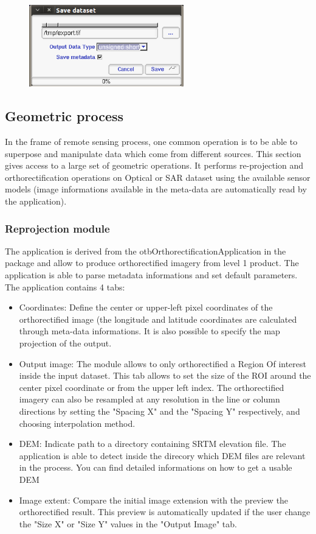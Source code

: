 \begin{figure}
  \center
  \includegraphics[width=0.6\textwidth]{../Art/MonteverdiImages/monteverdi_export_dataset.png}
  \label{fig:concatenate}
\end{figure}

\subsection{Geometric process}
In the frame of remote sensing process, one common operation is to be
able to superpose and manipulate data which come from different
sources.  This section gives access to a large set of geometric
operations.  It performs re-projection and orthorectification
operations on Optical or SAR dataset using the available sensor models
(image informations available in the meta-data are automatically read
by the application).  
\subsubsection{Reprojection module}
The application is derived from the otbOrthorectificationApplication
in the \app package and allow to produce orthorectified imagery from
level 1 product. The application is able to parse metadata
informations and set default parameters. The application contains 4
tabs:

\begin{itemize}
\item Coordinates: Define the center or upper-left pixel coordinates
  of the orthorectified image (the longitude and latitude coordinates
  are calculated through meta-data informations. It is also possible
  to specify the map projection of the output.
\item Output image: The module allows to only orthorectified a Region
  Of interest inside the input dataset. This tab allows to set the size
  of the ROI around the center pixel coordinate or from the upper
  left index. The orthorectified imagery can also be resampled at any
  resolution in the line or column directions by setting the "Spacing
  X" and the "Spacing Y" respectively, and choosing interpolation method.
\item DEM: Indicate path to a directory containing SRTM elevation
  file. The application is able to detect inside the direcory which
  DEM files are relevant in the process. You can find detailed
  informations on how to get a usable DEM
\item Image extent: Compare the initial image extension with the
  preview the orthorectified result. This preview is automatically
  updated if the user change the "Size X" or "Size Y" values in the
  "Output Image" tab.
\end{itemize}

